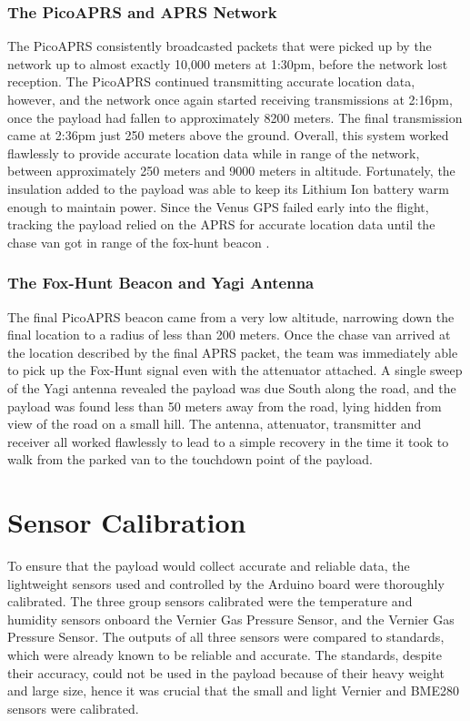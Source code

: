 \documentclass[12pt,]{article}
\begin{document}
\subsubsection{The PicoAPRS and APRS
Network}\label{the-picoaprs-and-aprs-network}

The PicoAPRS consistently broadcasted packets that were picked up by the
network up to almost exactly 10,000 meters at 1:30pm, before the network
lost reception. The PicoAPRS continued transmitting accurate location
data, however, and the network once again started receiving
transmissions at 2:16pm, once the payload had fallen to approximately
8200 meters. The final transmission came at 2:36pm just 250 meters above
the ground. Overall, this system worked flawlessly to provide accurate
location data while in range of the network, between approximately 250
meters and 9000 meters in altitude. Fortunately, the insulation added to
the payload was able to keep its Lithium Ion battery warm enough to
maintain power. Since the Venus GPS failed early into the flight,
tracking the payload relied on the APRS for accurate location data until
the chase van got in range of the fox-hunt beacon .

\subsubsection{The Fox-Hunt Beacon and Yagi
Antenna}\label{the-fox-hunt-beacon-and-yagi-antenna}

The final PicoAPRS beacon came from a very low altitude, narrowing down
the final location to a radius of less than 200 meters. Once the chase
van arrived at the location described by the final APRS packet, the team
was immediately able to pick up the Fox-Hunt signal even with the
attenuator attached. A single sweep of the Yagi antenna revealed the
payload was due South along the road, and the payload was found less
than 50 meters away from the road, lying hidden from view of the road on
a small hill. The antenna, attenuator, transmitter and receiver all
worked flawlessly to lead to a simple recovery in the time it took to
walk from the parked van to the touchdown point of the payload.

\section{Sensor Calibration}\label{sensor-calibration}

To ensure that the payload would collect accurate and reliable data, the
lightweight sensors used and controlled by the Arduino board were
thoroughly calibrated. The three group sensors calibrated were the
temperature and humidity sensors onboard the Vernier Gas Pressure
Sensor, and the Vernier Gas Pressure Sensor. The outputs of all three
sensors were compared to standards, which were already known to be
reliable and accurate. The standards, despite their accuracy, could not
be used in the payload because of their heavy weight and large size,
hence it was crucial that the small and light Vernier and BME280 sensors
were calibrated.
\end{document}
